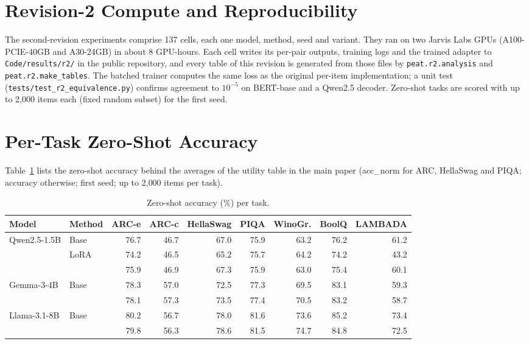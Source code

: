 \section{Revision-2 Compute and Reproducibility}
\label{sup:r2compute}

The second-revision experiments comprise 137 cells, each one model, method, seed and variant.
They ran on two Jarvis Labs GPUs (A100-PCIE-40GB and A30-24GB) in about 8 GPU-hours.
Each cell writes its per-pair outputs, training logs and the trained adapter to
\texttt{Code/results/r2/} in the public repository, and every table of this revision is generated from
those files by \texttt{peat.r2.analysis} and \texttt{peat.r2.make\_tables}.
The batched trainer computes the same loss as the original per-item implementation; a unit test
(\texttt{tests/test\_r2\_equivalence.py}) confirms agreement to $10^{-5}$ on BERT-base and a Qwen2.5 decoder.
Zero-shot tasks are scored with up to 2{,}000 items each (fixed random subset) for the first seed.

\section{Per-Task Zero-Shot Accuracy}
\label{sup:zeroshot}

Table~\ref{sup:tab:zeroshot} lists the zero-shot accuracy behind the averages of the utility table in
the main paper (acc\_norm for ARC, HellaSwag and PIQA; accuracy otherwise; first seed; up to 2{,}000
items per task).

\begin{table}[h]
  \centering
  \caption{Zero-shot accuracy (\%) per task.}
  \label{sup:tab:zeroshot}
  \footnotesize\setlength{\tabcolsep}{4pt}
  \begin{tabular}{@{}llrrrrrrr@{}}
    \toprule
    Model & Method & ARC-e & ARC-c & HellaSwag & PIQA & WinoGr. & BoolQ & LAMBADA \\
    \midrule
    Qwen2.5-1.5B & Base & 76.7 & 46.7 & 67.0 & 75.9 & 63.2 & 76.2 & 61.2 \\
     & LoRA & 74.2 & 46.5 & 65.2 & 75.7 & 64.2 & 74.2 & 43.2 \\
     & \PEAT{} & 75.9 & 46.9 & 67.3 & 75.9 & 63.0 & 75.4 & 60.1 \\
    Gemma-3-4B & Base & 78.3 & 57.0 & 72.5 & 77.3 & 69.5 & 83.1 & 59.3 \\
     & \PEAT{} & 78.1 & 57.3 & 73.5 & 77.4 & 70.5 & 83.2 & 58.7 \\
    Llama-3.1-8B & Base & 80.2 & 56.7 & 78.0 & 81.6 & 73.6 & 85.2 & 73.4 \\
     & \PEAT{} & 79.8 & 56.3 & 78.6 & 81.5 & 74.7 & 84.8 & 72.5 \\
    \bottomrule
  \end{tabular}
\end{table}

